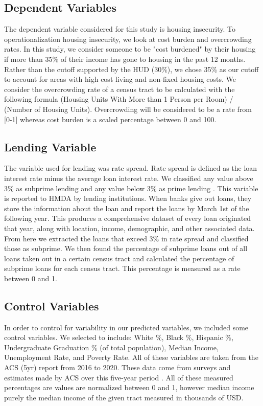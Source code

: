 \documentclass{article}
\begin{document}
\subsection{Dependent Variables}

The dependent variable considered for this study is housing insecurity. To operationalization housing insecurity, we look at cost burden and overcrowding rates. In this study, we consider someone to be "cost burdened" by their housing if more than 35\% of their income has gone to housing in the past 12 months. Rather than the cutoff supported by the HUD (30\%), we chose 35\% as our cutoff to account for areas with high cost living and non-fixed housing costs. We consider the overcrowding rate of a census tract to be calculated with the following formula (Housing Units With More than 1 Person per Room) / (Number of Housing Units). Overcrowding will be considered to be a rate from [0-1] whereas cost burden is a scaled percentage between 0 and 100. 

\subsection{Lending Variable}

The variable used for lending was rate spread. Rate spread is defined as the loan interest rate minus the average loan interest rate. We classified any value above 3\% as subprime lending and any value below 3\% as prime lending \cite{cfpb_hmda_2007_2010}. This variable is reported to HMDA by lending institutions. When banks give out loans, they store the information about the loan and report the loans by March 1st of the following year. This produces a comprehensive dataset of every loan originated that year, along with location, income, demographic, and other associated data. From here we extracted the loans that exceed 3\% in rate spread and classified those as subprime. We then found the percentage of subprime loans out of all loans taken out in a certain census tract and calculated the percentage of subprime loans for each census tract. This percentage is measured as a rate between 0 and 1. 

\subsection{Control Variables}

In order to control for variability in our predicted variables, we included some control variables. We selected to include: White \%, Black \%, Hispanic \%, Undergraduate Graduation \% (of total population), Median Income, Unemployment Rate, and Poverty Rate. All of these variables are taken from the ACS (5yr) report from 2016 to 2020. These data come from surveys and estimates made by ACS over this five-year period \cite{census_acs_2016_2020}. All of these measured percentages are values are normalized between 0 and 1, however median income purely the median income of the given tract measured in thousands of USD. 
\end{document}
